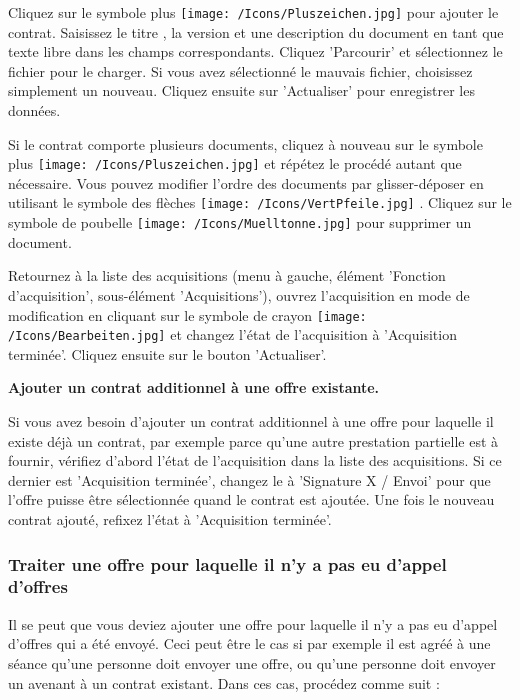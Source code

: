 Cliquez sur le symbole plus \texttt{[image: /Icons/Pluszeichen.jpg]}  pour ajouter le contrat. Saisissez le titre , la version  et une description du document  en tant que texte libre dans les champs correspondants. Cliquez 'Parcourir'  et sélectionnez le fichier pour le charger. Si vous avez sélectionné le mauvais fichier, choisissez simplement un nouveau. Cliquez ensuite sur 'Actualiser'  pour enregistrer les données.

\vspace{\baselineskip}

Si le contrat comporte plusieurs documents, cliquez à nouveau sur le symbole plus \texttt{[image: /Icons/Pluszeichen.jpg]}  et répétez le procédé autant que nécessaire. Vous pouvez modifier l'ordre des documents par glisser-déposer en utilisant le symbole des flèches \texttt{[image: /Icons/VertPfeile.jpg]} . Cliquez sur le symbole de poubelle \texttt{[image: /Icons/Muelltonne.jpg]}  pour supprimer un document.
\vspace{\baselineskip}

Retournez à la liste des acquisitions (menu à gauche, élément 'Fonction d'acquisition', sous-élément 'Acquisitions'), ouvrez l'acquisition en mode de modification en cliquant sur le symbole de crayon \texttt{[image: /Icons/Bearbeiten.jpg]} et changez l'état de l'acquisition à 'Acquisition terminée'. Cliquez ensuite sur le bouton 'Actualiser'.

\vspace{\baselineskip}

\textbf{Ajouter un contrat additionnel à une offre existante.}

Si vous avez besoin d'ajouter un contrat additionnel à une offre pour laquelle il existe déjà un contrat, par exemple parce qu'une autre prestation partielle est à fournir, vérifiez d'abord l'état de l'acquisition dans la liste des acquisitions. Si ce dernier est 'Acquisition terminée', changez le à 'Signature X / Envoi' pour que l'offre puisse être sélectionnée quand le contrat est ajoutée. Une  fois le nouveau contrat ajouté, refixez l'état à 'Acquisition terminée'.

\subsubsection{Traiter une offre pour laquelle il n'y a pas eu d'appel d'offres}

Il se peut que vous deviez ajouter une offre pour laquelle il n'y a pas eu d'appel d'offres qui a été envoyé. Ceci peut être le cas si par exemple il est agréé à une séance qu'une personne doit envoyer une offre, ou qu'une personne doit envoyer un avenant à un contrat existant. Dans ces cas, procédez comme suit :


